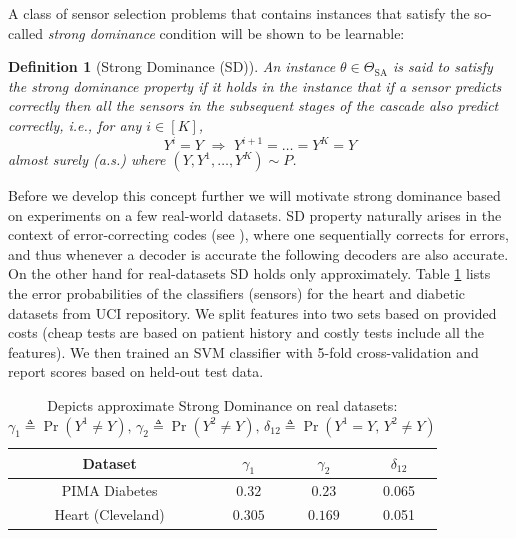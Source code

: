 \documentclass[11pt]{article} %
\newcommand{\SA}{\mathrm{SA}}
\newcommand{\TSA}{\Theta_{\SA}}
\newcommand{\ses}{sensor selection\xspace}
\newtheorem{defi}{Definition}
\begin{document}
A class of \ses problems that contains instances that satisfy the so-called \emph{strong dominance} condition 
will be shown to be learnable:
\begin{defi}[Strong Dominance (SD)]
	An instance $\theta \in \TSA$  is said to satisfy the \emph{strong dominance property} if 
	it holds in the instance that if a sensor predicts correctly
	then all the sensors in the subsequent stages of the cascade also predict correctly, i.e., 
	for any $i\in [K]$,
	\begin{equation}
	\label{eqn:DominanceCondition}
	Y^i=Y \,\, \Rightarrow\,\, Y^{i+1}= \dots =  Y^K = Y
	\end{equation}
	almost surely (a.s.)
	where $(Y,Y^1,\dots,Y^K)\sim P$.
\end{defi}
Before we develop this concept further we will motivate strong dominance based on experiments on a few real-world datasets. SD property naturally arises in the context of error-correcting codes (see \cite{costello,voyager}), where one sequentially corrects for errors, and thus whenever a decoder is accurate the following decoders are also accurate. On the other hand for real-datasets SD holds only approximately. Table \ref{tab:ErrorTable1} lists the error probabilities of the classifiers (sensors) for the heart and diabetic datasets from UCI repository. We split features into two sets based on provided costs (cheap tests are based on patient history and costly tests include all the features). We then trained an SVM classifier with 5-fold cross-validation and report scores based on held-out test data. 
\begin{table}[h]
\vspace{-6pt}
\begin{center}
\begin{tabular}[c]{c|c|c|c } 
Dataset & $\gamma_1$ & $\gamma_2$ & $\delta_{12}$\\ \hline \hline
PIMA Diabetes & $0.32 $ & $ 0.23$  & 0.065\\  \hline
Heart (Cleveland) & $0.305$ & $0.169$ &  0.051\\  \hline
\end{tabular}
\label{tab:ErrorTable1}
\caption{\footnotesize Depicts approximate Strong Dominance on real datasets: $\gamma_1 \triangleq \Pr(Y^1 \neq Y),\,\gamma_2\triangleq \Pr(Y^2 \neq Y),\, \delta_{12} \triangleq \Pr(Y^1=Y,\, Y^2\neq Y)$ }
\end{center}
\vspace{-13pt}
\end{table}
\end{document}

